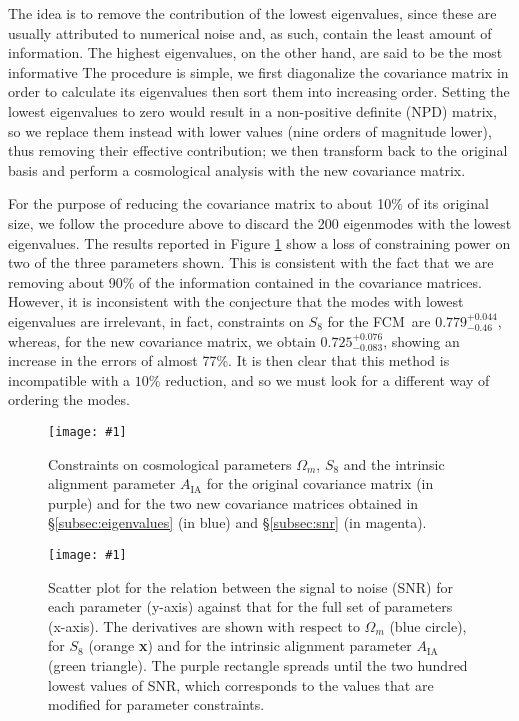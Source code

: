 \documentclass[aps, prd, twocolumn, superscriptaddress, nofootinbib, amssymb, amsmath]{revtex4-2}
\newcommand{\sfig}[2]{
	\texttt{[image: \#1]}
}
\newcommand{\Sfig}[3]{
	\begin{figure}[#1]
		\sfig{../figures/#2.pdf}{\columnwidth}
		\caption{#3}
		\label{fig:#2}
	\end{figure}
}
\newcommand{\Swide}[3]{
	\begin{figure*}[#1]
		\sfig{../figures/#2.pdf}{\textwidth}
		\caption{#3}
		\label{fig:#2}
	\end{figure*}
}
\newcommand{\rf}[1]{Figure \ref{fig:#1}}
\newcommand{\rssec}[1]{\S\ref{subsec:#1}}
\newcommand\full{the FCM}
\begin{document}
The idea is to remove the contribution of the lowest eigenvalues, since these are usually attributed to numerical noise and, as such, contain the least amount of information. The highest eigenvalues, on the other hand, are said to be the most informative \cite{Vogeley:1996} The procedure is simple, we first diagonalize the covariance matrix in order to calculate its eigenvalues then sort them into increasing order. Setting the lowest eigenvalues to zero would result in a non-positive definite (NPD) matrix, so we replace them instead with lower values (nine orders of magnitude lower), thus removing their effective contribution; we then transform back to the original basis and perform a cosmological analysis with the new covariance matrix.

For the purpose of reducing the covariance matrix to about 10\% of its original size, we follow the procedure above to discard the 200 eigenmodes with the lowest eigenvalues. The results reported in \rf{EigSNR-constraints_wmS8A} show a loss of constraining power on two of the three parameters shown. This is consistent with the fact that we are removing about 90\% of the information contained in the covariance matrices. However, it is inconsistent with the conjecture that the modes with lowest eigenvalues are irrelevant, in fact, constraints on $S_8$ for \full\ are $0.779^{+ 0.044}_{- 0.46}$, whereas, for the new covariance matrix, we obtain $0.725^{+ 0.076}_{- 0.083}$, showing an increase in the errors of almost 77\%. It is then clear that this method is incompatible with a $10\%$ reduction, and so we must look for a different way of ordering the modes.

\Sfig{thbp}{EigSNR-constraints_wmS8A}{Constraints on cosmological parameters $\Omega_m$, $S_8$ and the intrinsic alignment parameter $A_{\text{IA}}$ for the original covariance matrix (in purple) and for the two new covariance matrices obtained in \rssec{eigenvalues} (in blue) and \rssec{snr} (in magenta).}

\Swide{thbp}{SNR_cuts200}{Scatter plot for the relation between the signal to noise (SNR)  for each parameter (y-axis) against that for the full set of parameters (x-axis). The derivatives are shown with respect to $\Omega_m$ (blue circle), for $S_8$ (orange \textbf{x}) and for the intrinsic alignment parameter $A_{\text{IA}}$ (green triangle). The purple rectangle spreads until the two hundred lowest values of SNR, which corresponds to the values that are modified for parameter constraints.}

\end{document}
